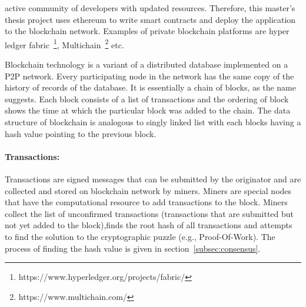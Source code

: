 active community of developers with updated resources. Therefore, this master's
thesis project uses ethereum to write smart contracts and deploy the
application to the blockchain network. Examples of private blockchain
platforms are hyper ledger
fabric~\footnote{https://www.hyperledger.org/projects/fabric/},
Multichain~\footnote{https://www.multichain.com/} etc.\par
Blockchain technology is a variant of a distributed database implemented on a
P2P network. Every participating node in the network has the same copy of the
history of records of the database. It is essentially a chain of blocks, as the
name suggests. Each block consists of a list of transactions and the ordering
of block shows the time at which the particular block was added to the chain.
The data structure of blockchain is analogous to singly linked list with each
blocks having a hash value pointing to the previous block. \par
\paragraph{Transactions:} Transactions are signed messages that can be
submitted by the originator and are collected and stored on blockchain network
by miners. Miners are special nodes that have the computational resource to add
transactions to the block. Miners collect the list of unconfirmed transactions
(transactions that are submitted but not yet added to the block),finds the root
hash of all transactions and attempts to find the solution to the cryptographic
puzzle (e.g., Proof-Of-Work). The process of finding the hash value is given in
section~\ref{subsec:consensus}.


